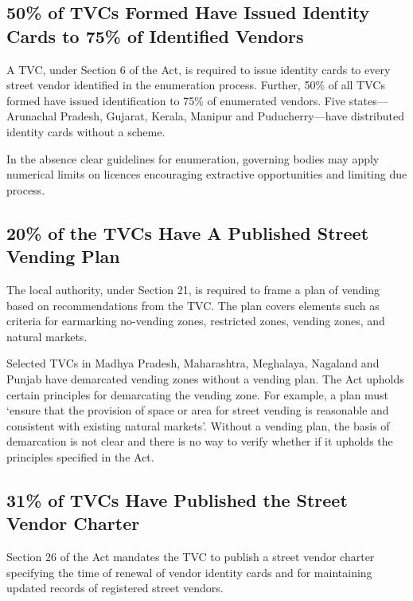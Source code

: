 \documentclass[a4paper, 12pt, twoside, table]{article}
\begin{document}
{\subsection*{50\% of TVCs Formed Have Issued Identity Cards to 75\% of Identified Vendors}

	A TVC, under Section 6 of the Act, is required to issue identity cards to every street vendor identified in the enumeration process. Further, 50\% of all TVCs formed have issued identification to 75\% of enumerated vendors. Five states—Arunachal Pradesh, Gujarat, Kerala, Manipur and Puducherry—have distributed identity cards without a scheme.

	In the absence clear guidelines for enumeration, governing bodies may apply numerical limits on licences encouraging extractive opportunities and limiting due process.

\subsection*{20\% of the TVCs Have A Published Street Vending Plan}
	The local authority, under Section 21, is required to frame a plan of vending based on recommendations from the TVC. The plan covers elements such as criteria for earmarking no-vending zones, restricted zones, vending zones, and natural markets.

	Selected TVCs in Madhya Pradesh, Maharashtra, Meghalaya, Nagaland and Punjab have demarcated vending zones without a vending plan. The Act upholds certain principles for demarcating the vending zone. For example, a plan must `ensure that the provision of space or area for street vending is reasonable and consistent with existing natural markets'. Without a vending plan, the basis of demarcation is not clear and there is no way to verify whether if it upholds the principles specified in the Act.

\subsection*{31\% of TVCs Have Published the Street Vendor Charter}
	Section 26 of the Act mandates the TVC to publish a street vendor charter specifying the time of renewal of vendor identity cards and for maintaining updated records of registered street vendors.

}
\end{document}

